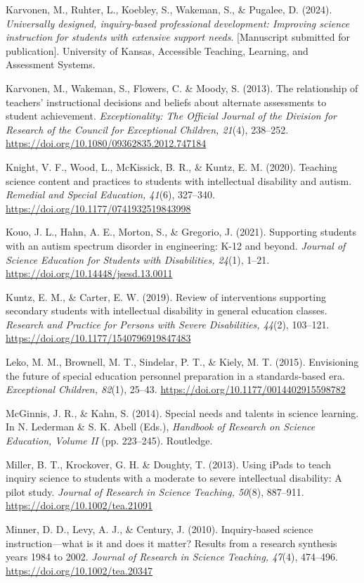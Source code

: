 \documentclass[11.5pt]{sig-alternate} %
\begin{document}
Karvonen, M., Ruhter, L., Koebley, S., Wakeman, S., \& Pugalee, D. (2024). \textit{Universally designed, inquiry-based professional development: Improving science instruction for students with extensive support needs}. [Manuscript submitted for publication]. University of Kansas, Accessible Teaching, Learning, and Assessment Systems.

Karvonen, M., Wakeman, S., Flowers, C. \& Moody, S. (2013). The relationship of teachers’ instructional decisions and beliefs about alternate assessments to student achievement. \textit{Exceptionality: The Official Journal of the Division for Research of the Council for Exceptional Children, 21}(4), 238–252. \url{https://doi.org/10.1080/09362835.2012.747184}

Knight, V. F., Wood, L., McKissick, B. R., \& Kuntz, E. M. (2020). Teaching science content and practices to students with intellectual disability and autism. \textit{Remedial and Special Education, 41}(6), 327–340. \url{https://doi.org/10.1177/0741932519843998}

Kouo, J. L., Hahn, A. E., Morton, S., \& Gregorio, J. (2021). Supporting students with an autism spectrum disorder in engineering: K-12 and beyond. \textit{Journal of Science Education for Students with Disabilities, 24}(1), 1–21. \url{https://doi.org/10.14448/jsesd.13.0011}

Kuntz, E. M., \& Carter, E. W. (2019). Review of interventions supporting secondary students with intellectual disability in general education classes. \textit{Research and Practice for Persons with Severe Disabilities, 44}(2), 103–121. \url{https://doi.org/10.1177/1540796919847483}

Leko, M. M., Brownell, M. T., Sindelar, P. T., \& Kiely, M. T. (2015). Envisioning the future of special education personnel preparation in a standards-based era. \textit{Exceptional Children, 82}(1), 25–43. \url{https://doi.org/10.1177/0014402915598782}

McGinnis, J. R., \& Kahn, S. (2014). Special needs and talents in science learning. In N. Lederman \& S. K. Abell (Eds.), \textit{Handbook of Research on Science Education, Volume II} (pp. 223–245). Routledge.

Miller, B. T., Krockover, G. H. \& Doughty, T. (2013). Using iPads to teach inquiry science to students with a moderate to severe intellectual disability: A pilot study. \textit{Journal of Research in Science Teaching, 50}(8), 887–911. \url{https://doi.org/10.1002/tea.21091}

Minner, D. D., Levy, A. J., \& Century, J. (2010). Inquiry‐based science instruction—what is it and does it matter? Results from a research synthesis years 1984 to 2002. \textit{Journal of Research in Science Teaching, 47}(4), 474–496. \url{https://doi.org/10.1002/tea.20347}
\end{document}
